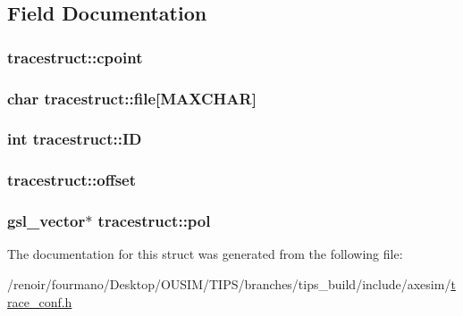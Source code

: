 \subsection{Field Documentation}
\hypertarget{structtracestruct_a52773e2c3477372748e0c61bf33b480f}{
\subsubsection[{cpoint}]{ {\bf tracestruct::cpoint}}}
\label{structtracestruct_a52773e2c3477372748e0c61bf33b480f}
\hypertarget{structtracestruct_a5ac820d6af1c733d11c029728cac779d}{
\subsubsection[{file}]{\setlength{\rightskip}{0pt plus 5cm}char {\bf tracestruct::file}\mbox{[}MAXCHAR\mbox{]}}}
\label{structtracestruct_a5ac820d6af1c733d11c029728cac779d}
\hypertarget{structtracestruct_a57fffc0d06bc78aa385b17ee80bb5c0e}{
\subsubsection[{ID}]{\setlength{\rightskip}{0pt plus 5cm}int {\bf tracestruct::ID}}}
\label{structtracestruct_a57fffc0d06bc78aa385b17ee80bb5c0e}
\hypertarget{structtracestruct_a036bfe31dd2376d708c7ee84adfcb035}{
\subsubsection[{offset}]{ {\bf tracestruct::offset}}}
\label{structtracestruct_a036bfe31dd2376d708c7ee84adfcb035}
\hypertarget{structtracestruct_a42797f7a46efa0ea3e5ec4c7512906e1}{
\subsubsection[{pol}]{\setlength{\rightskip}{0pt plus 5cm}gsl\_\-vector$\ast$ {\bf tracestruct::pol}}}
\label{structtracestruct_a42797f7a46efa0ea3e5ec4c7512906e1}


The documentation for this struct was generated from the following file:\begin{DoxyCompactItemize}
\item 
/renoir/fourmano/Desktop/OUSIM/TIPS/branches/tips\_\-build/include/axesim/\hyperlink{trace__conf_8h}{trace\_\-conf.h}\end{DoxyCompactItemize}
